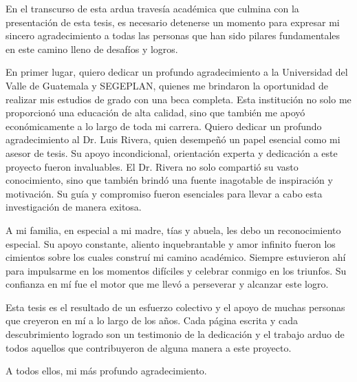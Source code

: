 
En el transcurso de esta ardua travesía académica que culmina con la presentación de esta tesis, es necesario detenerse un momento para expresar mi sincero agradecimiento a todas las personas que han sido pilares fundamentales en este camino lleno de desafíos y logros.

En primer lugar, quiero dedicar un profundo agradecimiento a la Universidad del Valle de Guatemala y SEGEPLAN, quienes me brindaron la oportunidad de realizar mis estudios de grado con una beca completa. Esta institución no solo me proporcionó una educación de alta calidad, sino que también me apoyó económicamente a lo largo de toda mi carrera. 
Quiero dedicar un profundo agradecimiento al Dr. Luis Rivera, quien desempeñó un papel esencial como mi asesor de tesis. Su apoyo incondicional, orientación experta y dedicación a este proyecto fueron invaluables. El Dr. Rivera no solo compartió su vasto conocimiento, sino que también brindó una fuente inagotable de inspiración y motivación. Su guía y compromiso fueron esenciales para llevar a cabo esta investigación de manera exitosa.

A mi familia, en especial a mi madre, tías y abuela, les debo un reconocimiento especial. Su apoyo constante, aliento inquebrantable y amor infinito fueron los cimientos sobre los cuales construí mi camino académico. Siempre estuvieron ahí para impulsarme en los momentos difíciles y celebrar conmigo en los triunfos. Su confianza en mí fue el motor que me llevó a perseverar y alcanzar este logro.

Esta tesis es el resultado de un esfuerzo colectivo y el apoyo de muchas personas que creyeron en mí a lo largo de los años. Cada página escrita y cada descubrimiento logrado son un testimonio de la dedicación y el trabajo arduo de todos aquellos que contribuyeron de alguna manera a este proyecto.

A todos ellos, mi más profundo agradecimiento.